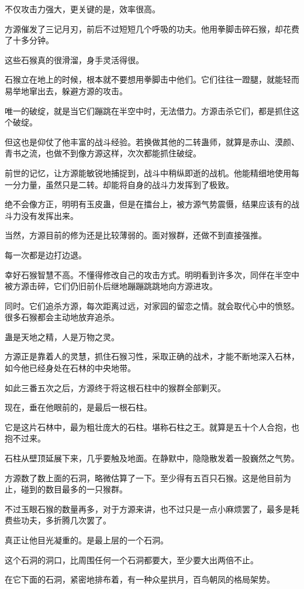 \begin{this_body}
不仅攻击力强大，更关键的是，效率很高。

方源催发了三记月刃，前后不过短短几个呼吸的功夫。他用拳脚击碎石猴，却花费了十多分钟。

这些石猴真的很滑溜，身手灵活得很。

石猴立在地上的时候，根本就不要想用拳脚击中他们。它们往往一蹬腿，就能轻而易举地窜出去，躲避方源的攻击。

唯一的破绽，就是当它们蹦跳在半空中时，无法借力。方源击杀它们，都是抓住这个破绽。

但这也是仰仗了他丰富的战斗经验。若换做其他的二转蛊师，就算是赤山、漠颜、青书之流，也做不到像方源这样，次次都能抓住破绽。

前世的记忆，让方源能敏锐地捕捉到，战斗中稍纵即逝的战机。他能精细地使用每一分力量，虽然只是二转。却能将自身的战斗力发挥到了极致。

绝不会像方正，明明有玉皮蛊，但是在擂台上，被方源气势震慑，结果应该有的战斗力没有发挥出来。

当然，方源目前的修为还是比较薄弱的。面对猴群，还做不到直接强推。

每一次都是边打边退。

幸好石猴智慧不高。不懂得修改自己的攻击方式。明明看到许多次，同伴在半空中被方源击碎，它们仍旧前仆后继地蹦蹦跳跳地向方源进攻。

同时。它们追杀方源，每次距离过远，对家园的留恋之情。就会取代心中的愤怒。很多石猴都会主动地放弃追杀。

蛊是天地之精，人是万物之灵。

方源正是靠着人的灵慧，抓住石猴习性，采取正确的战术，才能不断地深入石林，如今他已经身处在石林的中央地带。

如此三番五次之后，方源终于将这根石柱中的猴群全部剿灭。

现在，垂在他眼前的，是最后一根石柱。

它是这片石林中，最为粗壮庞大的石柱。堪称石柱之王。就算是五十个人合抱，也抱不过来。

石柱从壁顶延展下来，几乎要触及地面。在静默中，隐隐散发着一股巍然之气势。

方源数了数上面的石洞，略微估算了一下。至少得有五百只石猴。这是他目前为止，碰到的数目最多的一只猴群。

不过玉眼石猴的数量再多，对于方源来讲，也不过只是一点小麻烦罢了，最多是耗费些功夫，多折腾几次罢了。

真正让他目光凝重的。是最上层的一个石洞。

这个石洞的洞口，比周围任何一个石洞都要大，至少要大出两倍不止。

在它下面的石洞，紧密地排布着，有一种众星拱月，百鸟朝凤的格局架势。


\end{this_body}
